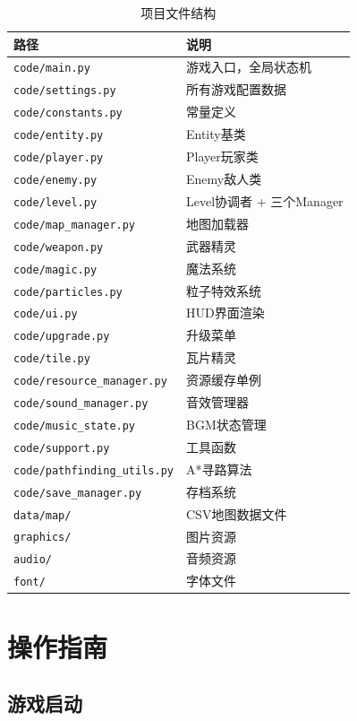 \documentclass[12pt,a4paper]{ctexart}
\begin{document}
\begin{table}[H]
\centering
\small
\begin{tabular}{ll}
\toprule
\textbf{路径} & \textbf{说明} \\
\midrule
\texttt{code/main.py} & 游戏入口，全局状态机 \\
\texttt{code/settings.py} & 所有游戏配置数据 \\
\texttt{code/constants.py} & 常量定义 \\
\texttt{code/entity.py} & Entity基类 \\
\texttt{code/player.py} & Player玩家类 \\
\texttt{code/enemy.py} & Enemy敌人类 \\
\texttt{code/level.py} & Level协调者 + 三个Manager \\
\texttt{code/map\_manager.py} & 地图加载器 \\
\texttt{code/weapon.py} & 武器精灵 \\
\texttt{code/magic.py} & 魔法系统 \\
\texttt{code/particles.py} & 粒子特效系统 \\
\texttt{code/ui.py} & HUD界面渲染 \\
\texttt{code/upgrade.py} & 升级菜单 \\
\texttt{code/tile.py} & 瓦片精灵 \\
\texttt{code/resource\_manager.py} & 资源缓存单例 \\
\texttt{code/sound\_manager.py} & 音效管理器 \\
\texttt{code/music\_state.py} & BGM状态管理 \\
\texttt{code/support.py} & 工具函数 \\
\texttt{code/pathfinding\_utils.py} & A*寻路算法 \\
\texttt{code/save\_manager.py} & 存档系统 \\
\texttt{data/map/} & CSV地图数据文件 \\
\texttt{graphics/} & 图片资源 \\
\texttt{audio/} & 音频资源 \\
\texttt{font/} & 字体文件 \\
\bottomrule
\end{tabular}
\caption{项目文件结构}
\end{table}

\section{操作指南}

\subsection{游戏启动}
\end{document}
